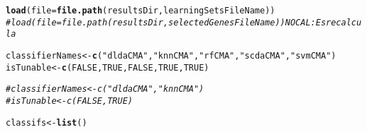 \documentclass{article}\usepackage[]{graphicx}\usepackage[]{color}
\makeatletter
\newcommand{\hlnum}[1]{\textcolor[rgb]{0.686,0.059,0.569}{#1}}%
\newcommand{\hlstr}[1]{\textcolor[rgb]{0.192,0.494,0.8}{#1}}%
\newcommand{\hlcom}[1]{\textcolor[rgb]{0.678,0.584,0.686}{\textit{#1}}}%
\newcommand{\hlstd}[1]{\textcolor[rgb]{0.345,0.345,0.345}{#1}}%
\newcommand{\hlkwb}[1]{\textcolor[rgb]{0.69,0.353,0.396}{#1}}%
\newcommand{\hlkwc}[1]{\textcolor[rgb]{0.333,0.667,0.333}{#1}}%
\newcommand{\hlkwd}[1]{\textcolor[rgb]{0.737,0.353,0.396}{\textbf{#1}}}%
\newenvironment{kframe}{%
 \def\at@end@of@kframe{}%
 \ifinner\ifhmode%
  \def\at@end@of@kframe{\end{minipage}}%
  \begin{minipage}{\columnwidth}%
 \fi\fi%
 \def\FrameCommand##1{\hskip\@totalleftmargin \hskip-\fboxsep
 \colorbox{shadecolor}{##1}\hskip-\fboxsep
     \hskip-\linewidth \hskip-\@totalleftmargin \hskip\columnwidth}%
 \MakeFramed {\advance\hsize-\width
   \@totalleftmargin\z@ \linewidth\hsize
   \@setminipage}}%
 {\par\unskip\endMakeFramed%
 \at@end@of@kframe}
\newenvironment{knitrout}{}{} %
\makeatother
\begin{document}
\begin{knitrout}
\color{fgcolor}\begin{kframe}
\begin{alltt}
\hlkwd{load}\hlstd{(}\hlkwc{file}\hlstd{=}\hlkwd{file.path}\hlstd{(resultsDir, learningSetsFileName))}
\hlcom{# load(file=file.path(resultsDir, selectedGenesFileName)) NO CAL: Es recalcula}

\hlstd{classifierNames} \hlkwb{<-} \hlkwd{c}\hlstd{(}\hlstr{"dldaCMA"}\hlstd{,} \hlstr{"knnCMA"}\hlstd{,} \hlstr{"rfCMA"}\hlstd{,} \hlstr{"scdaCMA"}\hlstd{,} \hlstr{"svmCMA"}\hlstd{)}
\hlstd{isTunable} \hlkwb{<-} \hlkwd{c}\hlstd{(}\hlnum{FALSE}\hlstd{,} \hlnum{TRUE}\hlstd{,} \hlnum{FALSE}\hlstd{,} \hlnum{TRUE}\hlstd{,} \hlnum{TRUE}\hlstd{)}

\hlcom{#classifierNames <- c("dldaCMA", "knnCMA")}
\hlcom{#isTunable <- c(FALSE, TRUE)}

\hlstd{classifs} \hlkwb{<-} \hlkwd{list}\hlstd{()}


\end{alltt}
\end{kframe}
\end{knitrout}
\end{document}
